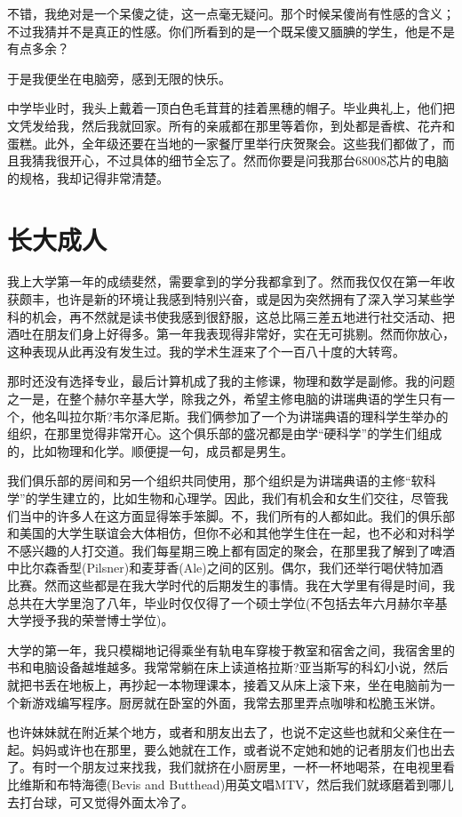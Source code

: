 不错，我绝对是一个呆傻之徒，这一点毫无疑问。那个时候呆傻尚有性感的含义；不过我猜并不是真正的性感。你们所看到的是一个既呆傻又腼腆的学生，他是不是有点多余？

于是我便坐在电脑旁，感到无限的快乐。

中学毕业时，我头上戴着一顶白色毛茸茸的挂着黑穗的帽子。毕业典礼上，他们把文凭发给我，然后我就回家。所有的亲戚都在那里等着你，到处都是香槟、花卉和蛋糕。此外，全年级还要在当地的一家餐厅里举行庆贺聚会。这些我们都做了，而且我猜我很开心，不过具体的细节全忘了。然而你要是问我那台68008芯片的电脑的规格，我却记得非常清楚。

 
\section{长大成人}

我上大学第一年的成绩斐然，需要拿到的学分我都拿到了。然而我仅仅在第一年收获颇丰，也许是新的环境让我感到特别兴奋，或是因为突然拥有了深入学习某些学科的机会，再不然就是读书使我感到很舒服，这总比隔三差五地进行社交活动、把酒吐在朋友们身上好得多。第一年我表现得非常好，实在无可挑剔。然而你放心，这种表现从此再没有发生过。我的学术生涯来了个一百八十度的大转弯。

那时还没有选择专业，最后计算机成了我的主修课，物理和数学是副修。我的问题之一是，在整个赫尔辛基大学，除我之外，希望主修电脑的讲瑞典语的学生只有一个，他名叫拉尔斯?韦尔泽尼斯。我们俩参加了一个为讲瑞典语的理科学生举办的组织，在那里觉得非常开心。这个俱乐部的盛况都是由学“硬科学”的学生们组成的，比如物理和化学。顺便提一句，成员都是男生。

我们俱乐部的房间和另一个组织共同使用，那个组织是为讲瑞典语的主修“软科学”的学生建立的，比如生物和心理学。因此，我们有机会和女生们交往，尽管我们当中的许多人在这方面显得笨手笨脚。不，我们所有的人都如此。我们的俱乐部和美国的大学生联谊会大体相仿，但你不必和其他学生住在一起，也不必和对科学不感兴趣的人打交道。我们每星期三晚上都有固定的聚会，在那里我了解到了啤酒中比尔森香型(Pilsner)和麦芽香(Ale)之间的区别。偶尔，我们还举行喝伏特加酒比赛。然而这些都是在我大学时代的后期发生的事情。我在大学里有得是时间，我总共在大学里泡了八年，毕业时仅仅得了一个硕士学位(不包括去年六月赫尔辛基大学授予我的荣誉博士学位)。

大学的第一年，我只模糊地记得乘坐有轨电车穿梭于教室和宿舍之间，我宿舍里的书和电脑设备越堆越多。我常常躺在床上读道格拉斯?亚当斯写的科幻小说，然后就把书丢在地板上，再抄起一本物理课本，接着又从床上滚下来，坐在电脑前为一个新游戏编写程序。厨房就在卧室的外面，我常去那里弄点咖啡和松脆玉米饼。

也许妹妹就在附近某个地方，或者和朋友出去了，也说不定这些也就和父亲住在一起。妈妈或许也在那里，要么她就在工作，或者说不定她和她的记者朋友们也出去了。有时一个朋友过来找我，我们就挤在小厨房里，一杯一杯地喝茶，在电视里看比维斯和布特海德(Bevis and Butthead)用英文唱MTV，然后我们就琢磨着到哪儿去打台球，可又觉得外面太冷了。

